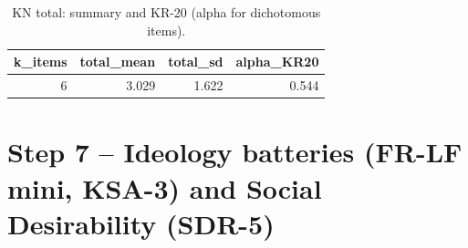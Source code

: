 \documentclass[
  10pt,
]{article}
\newenvironment{Shaded}{\begin{snugshade}}{\end{snugshade}}
\newcommand{\AttributeTok}[1]{\textcolor[rgb]{0.13,0.29,0.53}{#1}}
\newcommand{\ConstantTok}[1]{\textcolor[rgb]{0.56,0.35,0.01}{#1}}
\newcommand{\DecValTok}[1]{\textcolor[rgb]{0.00,0.00,0.81}{#1}}
\newcommand{\FunctionTok}[1]{\textcolor[rgb]{0.13,0.29,0.53}{\textbf{#1}}}
\newcommand{\NormalTok}[1]{#1}
\newcommand{\SpecialCharTok}[1]{\textcolor[rgb]{0.81,0.36,0.00}{\textbf{#1}}}
\newcommand{\StringTok}[1]{\textcolor[rgb]{0.31,0.60,0.02}{#1}}
\begin{document}
\begin{Shaded}
\end{Shaded}

\begin{longtable}[t]{rrrr}
\caption{\label{tab:kn-items}KN total: summary and KR-20 (alpha for dichotomous items).}\\
\toprule
k\_items & total\_mean & total\_sd & alpha\_KR20\\
\midrule
6 & 3.029 & 1.622 & 0.544\\
\bottomrule
\end{longtable}

\hypertarget{step-7-ideology-batteries-fr-lf-mini-ksa-3-and-social-desirability-sdr-5}{%
\section{Step 7 -- Ideology batteries (FR-LF mini, KSA-3) and Social
Desirability
(SDR-5)}\label{step-7-ideology-batteries-fr-lf-mini-ksa-3-and-social-desirability-sdr-5}}
\end{document}
